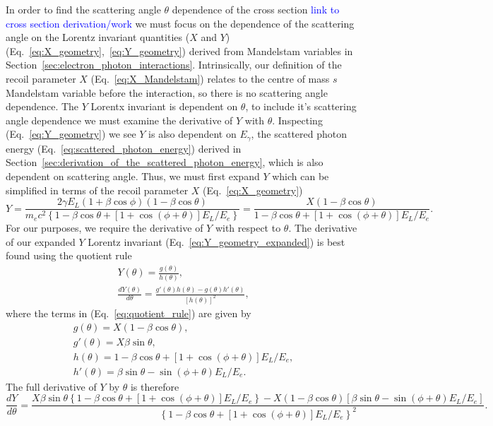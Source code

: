 \documentclass[../main.tex]{subfiles}
\begin{document}
In order to find the scattering angle $\theta$ dependence of the cross section \textcolor{blue}{link to cross section derivation/work} we must focus on the dependence of the scattering angle on the Lorentz invariant quantities ($X$ and $Y$) (Eq.~\ref{eq:X_geometry},~\ref{eq:Y_geometry}) derived from Mandelstam variables in Section~\ref{sec:electron_photon_interactions}. Intrinsically, our definition of the recoil parameter $X$ (Eq.~\ref{eq:X_Mandelstam}) relates to the centre of mass $s$ Mandelstam variable before the interaction, so there is no scattering angle  dependence. The $Y$ Lorentx invariant is dependent on $\theta$, to include it's scattering angle dependence we must examine the derivative of $Y$ with $\theta$. Inspecting (Eq.~\ref{eq:Y_geometry}) we see $Y$ is also dependent on $E_{\gamma}$, the scattered photon energy (Eq.~\ref{eq:scattered_photon_energy}) derived in Section~\ref{sec:derivation_of_the_scattered_photon_energy}, which is also dependent on scattering angle. Thus, we must first expand $Y$ which can be simplified in terms of the recoil parameter $X$ (Eq.~\ref{eq:X_geometry})
\begin{equation}
Y = \frac{2\gamma E_{L}\left(1+\beta\cos\phi\right)\left(1-\beta\cos\theta\right)}{m_{e}c^{2}\left\{1-\beta\cos\theta+\left[1+\cos\left(\phi+\theta\right)\right]E_{L}/E_{e}\right\}} = \frac{X\left(1-\beta\cos\theta\right)}{1-\beta\cos\theta+\left[1+\cos\left(\phi+\theta\right)\right]E_{L}/E_{e}}.
\label{eq:Y_geometry_expanded}
\end{equation}
For our purposes, we require the derivative of $Y$ with respect to $\theta$. The derivative of our expanded $Y$ Lorentz invariant (Eq.~\ref{eq:Y_geometry_expanded}) is best found using the quotient rule  
\begin{gather}
Y\left(\theta\right) = \frac{g\left(\theta\right)}{h\left(\theta\right)}, \\
\frac{dY\left(\theta\right)}{d\theta} = \frac{g'\left(\theta\right)h\left(\theta\right)-g\left(\theta\right)h'\left(\theta\right)}{\left[h\left(\theta\right)\right]^{2}},
\label{eq:quotient_rule}
\end{gather}
where the terms in (Eq.~\ref{eq:quotient_rule}) are given by
\begin{gather}
g\left(\theta\right) = X\left(1-\beta\cos\theta\right), \\
g'\left(\theta\right) = X\beta\sin\theta, \\
h\left(\theta\right) = 1-\beta\cos\theta+\left[1+\cos\left(\phi+\theta\right)\right]E_{L}/E_{e}, \\
h'\left(\theta\right) = \beta\sin\theta-\sin\left(\phi+\theta\right)E_{L}/E_{e}.
\label{eq:quotientterms}
\end{gather}
The full derivative of $Y$ by $\theta$ is therefore
\begin{equation}
\frac{dY}{d\theta} = \frac{X\beta\sin\theta\left\{1-\beta\cos\theta+\left[1+\cos\left(\phi+\theta\right)\right]E_{L}/E_{e}\right\}-X\left(1-\beta\cos\theta\right)\left[\beta\sin\theta-\sin\left(\phi+\theta\right)E_{L}/E_{e}\right]}{\left\{1-\beta\cos\theta+\left[1+\cos\left(\phi+\theta\right)\right]E_{L}/E_{e}\right\}^{2}}.
\label{eq:dY_dtheta}
\end{equation}
\end{document}
